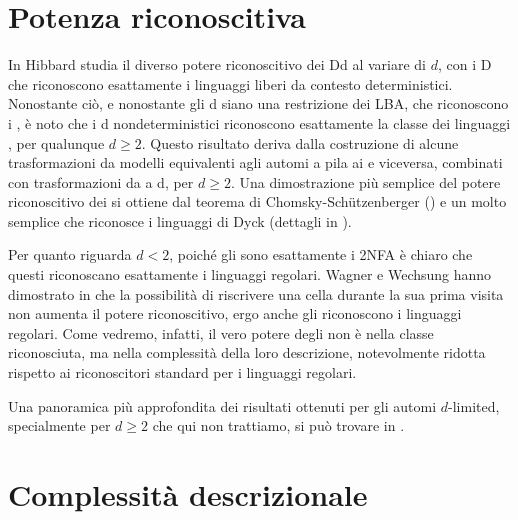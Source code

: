 \section{Potenza riconoscitiva}
In \cite{Hibbard:67:CFdet} Hibbard studia il diverso potere riconoscitivo dei D\la d al variare di $d$, con i D che riconoscono esattamente i linguaggi liberi da contesto deterministici. Nonostante ciò, e nonostante gli \la d siano una restrizione dei LBA, che riconoscono i , è noto che i \la d nondeterministici riconoscono esattamente la classe dei linguaggi , per qualunque $d\geq2$. Questo risultato deriva dalla costruzione di alcune trasformazioni da modelli equivalenti agli automi a pila ai  e viceversa, combinati con trasformazioni da  a \la d, per $d\geq2$. Una dimostrazione più semplice del potere riconoscitivo dei  si ottiene dal teorema di Chomsky-Schützenberger (\cite{Chomsky:63:algebraCF}) e un  molto semplice che riconosce i linguaggi di Dyck (dettagli in \cite{Pighizzini:19:limited}).

Per quanto riguarda $d<2$, poiché gli  sono esattamente i 2NFA è chiaro che questi riconoscano esattamente i linguaggi regolari. Wagner e Wechsung hanno dimostrato in \cite{Wagner:86:compCompl} che la possibilità di riscrivere una cella durante la sua prima visita non aumenta il potere riconoscitivo, ergo anche gli  riconoscono i linguaggi regolari. Come vedremo, infatti, il vero potere degli  non è nella classe riconosciuta, ma nella complessità della loro descrizione, notevolmente ridotta rispetto ai riconoscitori standard per i linguaggi regolari.

Una panoramica più approfondita dei risultati ottenuti per gli automi $d$-limited, specialmente per $d\geq2$ che qui non trattiamo, si può trovare in \cite{Pighizzini:19:limited}.



\section{Complessità descrizionale}
